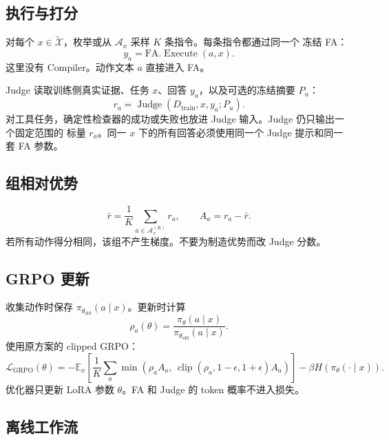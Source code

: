 \documentclass[11pt,UTF8,fontset=fandol]{ctexart}
\newcommand{\Dtrain}{D_{\mathrm{train}}}
\newcommand{\Xsim}{\widetilde{\mathcal X}}
\newcommand{\policy}{\pi_{\theta}}
\newcommand{\oldpolicy}{\pi_{\theta_{\mathrm{old}}}}
\newcommand{\FA}{\mathrm{FA}}
\newcommand{\Judge}{\operatorname{Judge}}
\newcommand{\clip}{\operatorname{clip}}
\begin{document}
\subsection{执行与打分}

对每个 \(x\in\Xsim\)，枚举或从 \(\mathcal A_x\) 采样 \(K\) 条指令。每条指令都通过同一个
冻结 FA：
\begin{equation}
  y_a=\FA.\operatorname{Execute}(a,x).
  \label{eq:execute}
\end{equation}
这里没有 Compiler。动作文本 \(a\) 直接进入 FA。

Judge 读取训练侧真实证据、任务 \(x\)、回答 \(y_a\)，以及可选的冻结摘要 \(P_u\)：
\begin{equation}
  r_a
  =
  \Judge(\Dtrain,x,y_a;P_u).
  \label{eq:reward}
\end{equation}
对工具任务，确定性检查器的成功或失败也放进 Judge 输入。Judge 仍只输出一个固定范围的
标量 \(r_a\)。同一 \(x\) 下的所有回答必须使用同一个 Judge 提示和同一套 FA 参数。

\subsection{组相对优势}

\begin{equation}
  \bar r
  =
  \frac{1}{K}\sum_{a\in\mathcal A_x^{(K)}}r_a,
  \qquad
  A_a=r_a-\bar r.
  \label{eq:advantage}
\end{equation}
若所有动作得分相同，该组不产生梯度。不要为制造优势而改 Judge 分数。

\subsection{GRPO 更新}

收集动作时保存 \(\oldpolicy(a\mid x)\)。更新时计算
\begin{equation}
  \rho_a(\theta)
  =
  \frac{\policy(a\mid x)}
       {\oldpolicy(a\mid x)}.
\end{equation}
使用原方案的 clipped GRPO：
\begin{equation}
  \mathcal L_{\mathrm{GRPO}}(\theta)
  =
  -\mathbb E_x
  \left[
  \frac{1}{K}
  \sum_a
  \min\left(
    \rho_a A_a,\,
    \clip(\rho_a,1-\epsilon,1+\epsilon)A_a
  \right)
  \right]
  -\beta H\!\left(\policy(\cdot\mid x)\right).
  \label{eq:grpo}
\end{equation}
优化器只更新 LoRA 参数 \(\theta\)。FA 和 Judge 的 token 概率不进入损失。

\subsection{离线工作流}
\end{document}
